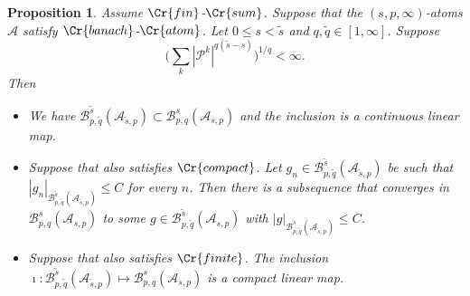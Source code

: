 \documentclass{amsart}
\newtheorem{proposition}[theorem]{Proposition}
\theoremstyle{definition}
\newcommand{\SB}{{\mathcal B}}
\newcommand{\Crr}[1]{\Cr{#1}}
\begin{document}
\begin{proposition} \label{compa} Assume ${\Crr{fin}}$-${\Crr{sum}}$. Suppose that the $(s,p,\infty)$-atoms $\mathcal{A}$ satisfy ${\Crr{banach}}$-${\Crr{atom}}$. Let $0\leq s < \tilde{s} $ and $q,\tilde{q} \in [1,\infty]$.  Suppose
$$\Big(  \sum_{k}  |\mathcal{P}^k|^{q(\tilde{s}-s)} \Big)^{1/q}  < \infty.$$
Then 
\begin{itemize}
\item[A.] We have $\mathcal{B}^{\tilde{s}}_{p,\tilde{q}}(\mathcal{A}_{\tilde{s},p})\subset \SB^s_{p,q}(\mathcal{A}_{s,p})$ and the inclusion is a continuous linear map.
\item[B.] Suppose that also satisfies ${\Crr{compact}}$.  Let $g_n \in \mathcal{B}^{\tilde{s}}_{p,\tilde{q}}(\mathcal{A}_{\tilde{s},p})$ be such that $|g_n|_{\mathcal{B}^{\tilde{s}}_{p,\tilde{q}}(\mathcal{A}_{\tilde{s},p})}\leq C$ for every $n$. Then there is a subsequence that converges in $\SB^s_{p,q}(\mathcal{A}_{s,p})$ to some $g \in \mathcal{B}^{\tilde{s}}_{p,\tilde{q}}(\mathcal{A}_{s,p})$ with $|g|_{\mathcal{B}^{\tilde{s}}_{p,\tilde{q}}(\mathcal{A}_{\tilde{s},p})}\leq C$. 
\item[C.] Suppose that also satisfies ${\Crr{finite}}$. The inclusion $\imath\colon \mathcal{B}^{\tilde{s}}_{p,\tilde{q}}(\mathcal{A}_{\tilde{s},p})\mapsto \SB^s_{p,q}(\mathcal{A}_{s,p})$ is a compact linear map. 
\end{itemize}
\end{proposition}
\end{document}
